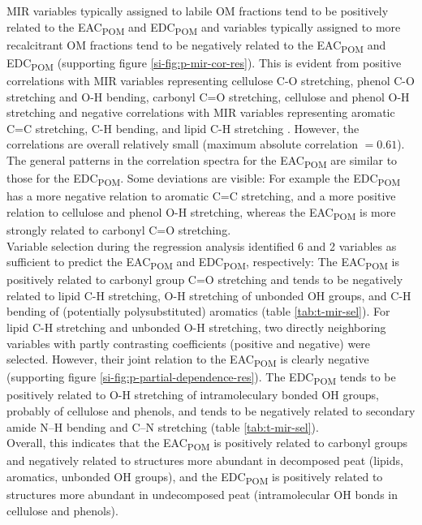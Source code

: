 \documentclass[draft,linenumbers]{agujournal2018}
\begin{document}
MIR variables typically assigned to labile OM fractions tend to be
positively related to the EAC\textsubscript{POM} and
EDC\textsubscript{POM} and variables typically assigned to more
recalcitrant OM fractions tend to be negatively related to the
EAC\textsubscript{POM} and EDC\textsubscript{POM} (supporting figure
\ref{si-fig:p-mir-cor-res}). This is evident from positive correlations
with MIR variables representing cellulose C-O stretching, phenol C-O
stretching and O-H bending, carbonyl C=O stretching, cellulose and
phenol O-H stretching and negative correlations with MIR variables
representing aromatic C=C stretching, C-H bending, and lipid C-H
stretching
\citep{Stuart.2005, Cocozza.2003, Artz.2008, Kubo.2005, Schmidt.2006}.
However, the correlations are overall relatively small (maximum absolute
correlation \(=0.61\)).\\
The general patterns in the correlation spectra for the
EAC\textsubscript{POM} are similar to those for the
EDC\textsubscript{POM}. Some deviations are visible: For example the
EDC\textsubscript{POM} has a more negative relation to aromatic C=C
stretching, and a more positive relation to cellulose and phenol O-H
stretching, whereas the EAC\textsubscript{POM} is more strongly related
to carbonyl C=O stretching.\\
Variable selection during the regression analysis identified 6 and 2
variables as sufficient to predict the EAC\textsubscript{POM} and
EDC\textsubscript{POM}, respectively: The EAC\textsubscript{POM} is
positively related to carbonyl group C=O stretching and tends to be
negatively related to lipid C-H stretching, O-H stretching of unbonded
OH groups, and C-H bending of (potentially polysubstituted) aromatics
(table \ref{tab:t-mir-sel}). For lipid C-H stretching and unbonded O-H
stretching, two directly neighboring variables with partly contrasting
coefficients (positive and negative) were selected. However, their joint
relation to the EAC\textsubscript{POM} is clearly negative (supporting
figure \ref{si-fig:p-partial-dependence-res}). The
EDC\textsubscript{POM} tends to be positively related to O-H stretching
of intramoleculary bonded OH groups, probably of cellulose and phenols,
and tends to be negatively related to secondary amide N--H bending and
C--N stretching (table \ref{tab:t-mir-sel}).\\
Overall, this indicates that the EAC\textsubscript{POM} is positively
related to carbonyl groups and negatively related to structures more
abundant in decomposed peat (lipids, aromatics, unbonded OH groups), and
the EDC\textsubscript{POM} is positively related to structures more
abundant in undecomposed peat (intramolecular OH bonds in cellulose and
phenols).
\end{document}
